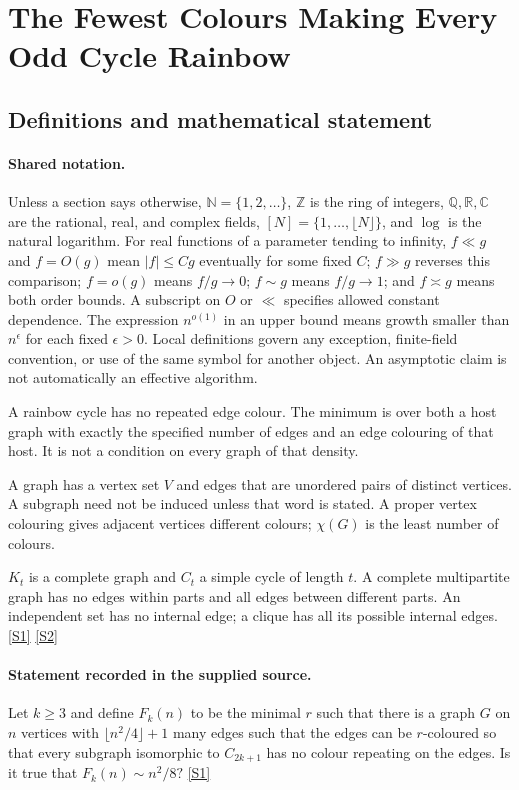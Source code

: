 \documentclass[11pt,a4paper]{article}
\newcommand{\N}{\mathbb{N}}
\newcommand{\Z}{\mathbb{Z}}
\newcommand{\Q}{\mathbb{Q}}
\newcommand{\R}{\mathbb{R}}
\newcommand{\C}{\mathbb{C}}
\newcommand{\sref}[2]{\hyperlink{source:#1:#2}{[S#2]}}
\begin{document}
\section{The Fewest Colours Making Every Odd Cycle Rainbow}\label{statement}


\subsection{Definitions and mathematical statement}

\paragraph{Shared notation.}Unless a section says otherwise, $\N=\{1,2,\ldots\}$,
$\Z$ is the ring of integers, $\Q,\R,\C$ are the rational, real, and complex
fields, $[N]=\{1,\ldots,\lfloor N\rfloor\}$, and $\log$ is the natural
logarithm. For real functions of a parameter tending to infinity,
$f\ll g$ and $f=O(g)$ mean $|f|\leq Cg$ eventually for some fixed $C$;
$f\gg g$ reverses this comparison; $f=o(g)$ means $f/g\to0$;
$f\sim g$ means $f/g\to1$; and $f\asymp g$ means both order bounds.
A subscript on $O$ or $\ll$ specifies allowed constant dependence.
The expression $n^{o(1)}$ in an upper bound means growth smaller than
$n^\epsilon$ for each fixed $\epsilon>0$. Local definitions govern any
exception, finite-field convention, or use of the same symbol for another
object. An asymptotic claim is not automatically an effective algorithm.



A rainbow cycle has no repeated edge colour. The minimum is over both a host graph with exactly the specified number of edges and an edge colouring of that host. It is not a condition on every graph of that density.

A graph has a vertex set $V$ and edges that are unordered pairs of distinct vertices. A subgraph need not be induced unless that word is stated. A proper vertex colouring gives adjacent vertices different colours; $\chi(G)$ is the least number of colours.

$K_t$ is a complete graph and $C_t$ a simple cycle of length $t$. A complete multipartite graph has no edges within parts and all edges between different parts. An independent set has no internal edge; a clique has all its possible internal edges. \sref{statement}{1} \sref{statement}{2}

\paragraph{Statement recorded in the supplied source.}
Let $k\geq 3$ and define $F_k(n)$ to be the minimal $r$ such that there is a graph $G$ on $n$ vertices with $\lfloor n^2/4\rfloor+1$ many edges such that the edges can be $r$-coloured so that every subgraph isomorphic to $C_{2k+1}$ has no colour repeating on the edges.
Is it true that $ F_k(n)\sim n^2/8? $ \sref{statement}{1}
\end{document}
